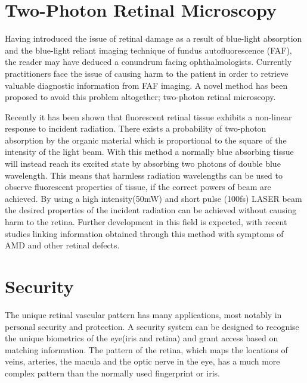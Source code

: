 
\section{Two-Photon Retinal Microscopy}

Having introduced the issue of retinal damage as a result of blue-light
absorption and the blue-light reliant imaging technique of fundus autofluorescence
(FAF), the reader may have deduced a conundrum facing ophthalmologists. Currently
practitioners face the issue of causing harm to the patient in order to retrieve
valuable diagnostic information from FAF imaging. A novel method has been proposed
to avoid this problem altogether; two-photon retinal microscopy.

Recently it has been shown that fluorescent retinal tissue exhibits a non-linear
response to incident radiation. \cite{denk1990two} There exists a probability of
two-photon absorption by the organic material which is proportional to the square
of the intensity of the light beam. With this method a normally blue absorbing
tissue will instead reach its excited state by absorbing two photons of double
blue wavelength. This means that harmless radiation wavelengths can be used to
observe fluorescent properties of tissue, if the correct powers of beam are
achieved. By using a high intensity(50mW) and short pulse (100fs) LASER beam the
desired properties of the incident radiation can be achieved without causing harm
to the retina. Further development in this field is expected, with recent studies
linking information obtained through this method with symptoms of AMD and other
retinal defects.\cite{palczewska2010noninvasive,palczewska2014noninvasive}

\section{Security}

The unique retinal vascular pattern has many applications, most notably in personal
security and protection. A security system can be designed to recognise the unique
biometrics of the eye(iris and retina) and grant access based on matching information.
The pattern of the retina, which maps the locations of veins, arteries, the macula
and the optic nerve in the eye, has a much more complex pattern than the normally
used fingerprint or iris.\cite{ortega_2009}

